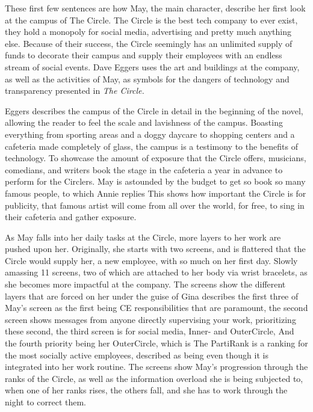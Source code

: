  \autocite[1]{eggers1} These first few sentences are how May, the main character, describe her first look at the campus of The Circle.
The Circle is the best tech company to ever exist, they hold a monopoly for social media, advertising and pretty much anything else.
Because of their success, the Circle seemingly has an unlimited supply of funds to decorate their campus and supply their employees with an endless stream of social events.
Dave Eggers uses the art and buildings at the company, as well as the activities of May, as symbols for the dangers of technology and transparency presented in \textit{The Circle.}

Eggers describes the campus of the Circle in detail in the beginning of the novel, allowing the reader to feel the scale and lavishness of the campus.
Boasting everything from sporting areas and a doggy daycare to shopping centers and a cafeteria made completely of glass, the campus is a testimony to the benefits of technology.
To showcase the amount of exposure that the Circle offers, musicians, comedians, and writers book the stage in the cafeteria a year in advance to perform for the Circlers.
May is astounded by the budget to get so book so many famous people, to which Annie replies  \autocite[14]{eggers1}
This shows how important the Circle is for publicity, that famous artist will come from all over the world, for free, to sing in their cafeteria and gather exposure.

As May falls into her daily tasks at the Circle, more layers to her work are pushed upon her.
Originally, she starts with two screens, and is flattered that the Circle would supply her, a new employee, with so much on her first day.
Slowly amassing 11 screens, two of which are attached to her body via wrist bracelets, as she becomes more impactful at the company.
The screens show the different layers that are forced on her under the guise of 
Gina describes the first three of May's screen as the first being CE responsibilities that are paramount, the second screen shows messages from anyone directly supervising your work, prioritizing these second, the third screen is for social media, Inner- and OuterCircle,  \autocite[57]{eggers1} 
And the fourth priority being her OuterCircle, which is  \autocite[57]{eggers1}
The PartiRank is a ranking for the most socially active employees, described as being  \autocite[58]{eggers1} even though it is integrated into her work routine.
The screens show May's progression through the ranks of the Circle, as well as the information overload she is being subjected to, when one of her ranks rises, the others fall, and she has to work through the night to correct them.

